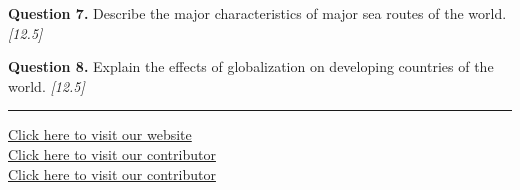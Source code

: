 \documentclass[11pt,a4paper]{article}
\newcommand{\pts}[1]{\hfill   \textit{[#1]}}
\begin{document}
\medskip


\noindent   \textbf{Question 7.} Describe the major characteristics of major sea routes of the world. \pts{12.5}

\medskip


\noindent   \textbf{Question 8.} Explain the effects of globalization on developing countries of the world. \pts{12.5}

\vfill\rule{\linewidth}{0.4pt}

\begin{center}\small
\href{https://bhu-exam.vercel.app/}{Click here to visit our website}\\[4pt]
\href{https://me-aryan.vercel.app/}{Click here to visit our contributor}\\[4pt]
\href{https://quashan-me.vercel.app/}{Click here to visit our contributor}
\end{center}
\end{document}
